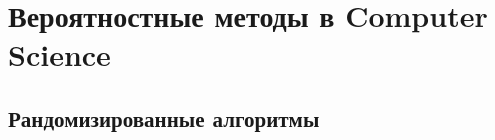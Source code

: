 \section{Вероятностные методы в Computer Science}

\subsection{Рандомизированные алгоритмы}

\begin{comment}
\begin{problem}

Пять философов сидят за круглым столом. В центре стола находится чаша со
спагетти. Между каждой парой соседних философов лежит вилка. Философы чередуют размышления с приемами пищи, не отвлекаясь на второстепенные занятия. Однако
для того, чтобы вытащить спагетти из чаши и донести их до рта философу требуются
две вилки. Каждый философ может взять вилку рядом с ним (если она доступна), или положить - если он уже держит её. Если требуемая вилка занята соседом, голодный философ вынужден ждать - он не может вернуться к размышлениям, не поев. После окончания еды философ кладет обе вилки на стол.

Время одного приема пищи одним философом равномерно распределено на отрезке [0, a]. 
Время одного размышления равномерно распределено на отрезке [0, b].

Данный процесс подвержен взаимной блокировке (Dead Lock): например, если каждый возьмет по левой вилке, то начнется вечное голодание. Для избежания блокировки каждый философ кладет первую вилку, если за время t после ее взятия вторая не освободилась.

Требуется определить распределение времени t, минимизирующее среднее время ожидания после размышления и перед приемом пищи.

\end{problem}
\end{comment}

